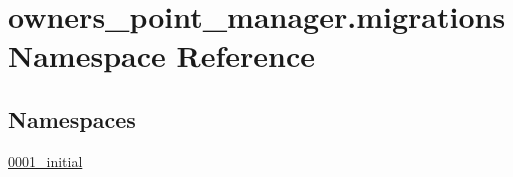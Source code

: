 \hypertarget{namespaceowners__point__manager_1_1migrations}{\section{owners\-\_\-point\-\_\-manager.\-migrations Namespace Reference}
\label{namespaceowners__point__manager_1_1migrations}
}
\subsection*{Namespaces}
\begin{DoxyCompactItemize}
\item 
\hyperlink{namespaceowners__point__manager_1_1migrations_1_10001__initial}{0001\-\_\-initial}
\end{DoxyCompactItemize}
